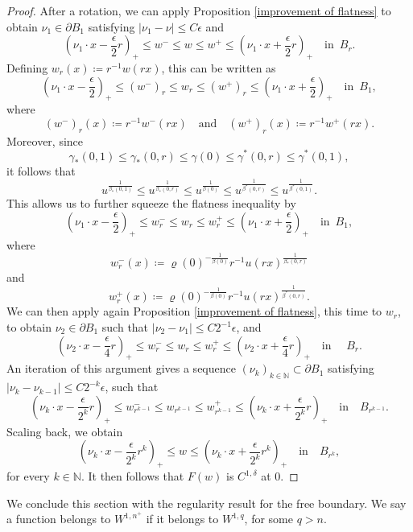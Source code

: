 \documentclass[reqno,11pt]{amsart}
\newcommand{\1}{\mathds{1}}
\numberwithin{equation}{section}
\begin{document}
\begin{proof}
After a rotation, we can apply Proposition \ref{improvement of flatness} to obtain $\nu_1 \in \partial B_1$ satisfying $|\nu_1 - \nu| \leq C\epsilon$ and
$$
    \left(\nu_1 \cdot x - \frac{\epsilon}{2}r\right)_+ \leq w^- \leq w \leq w^+ \leq \left(\nu_1 \cdot x + \frac{\epsilon}{2}r\right)_+ \quad \text{in }\, B_r.
$$ 
Defining $w_r(x) \coloneqq r^{-1}w(rx)$, this can be written as
$$
    \left(\nu_1 \cdot x - \frac{\epsilon}{2}\right)_+ \leq (w^-)_r \leq w_r \leq (w^+)_r \leq \left(\nu_1 \cdot x + \frac{\epsilon}{2}\right)_+ \quad \text{in }\, B_1,
$$
where
$$
   (w^-)_r(x) \coloneqq r^{-1}w^-(rx) \quad \text{and} \quad  (w^+)_r(x) \coloneqq r^{-1}w^+(rx).
$$
Moreover, since
$$
  \gamma_\ast(0,1) \leq \gamma_\ast(0,r) \leq \gamma(0) \leq \gamma^\ast(0,r) \leq \gamma^\ast(0,1),  
$$
it follows that
$$
    u^{\frac{1}{\beta_\ast(0,1)}} \leq u^{\frac{1}{\beta_\ast(0,r)}} \leq u^{\frac{1}{\beta(0)}} \leq u^{\frac{1}{\beta^\ast(0,r)}} \leq u^{\frac{1}{\beta^\ast(0,1)}}.
$$
This allows us to further squeeze the flatness inequality by
$$
    \left(\nu_1 \cdot x - \frac{\epsilon}{2}\right)_+ \leq w^-_r \leq w_r \leq w^+_r \leq \left(\nu_1 \cdot x + \frac{\epsilon}{2}\right)_+ \quad \text{in }\, B_1,
$$
where
$$w^-_r(x) \coloneqq \varrho(0)^{-\frac{1}{\beta(0)}} r^{-1}u(rx)^{\frac{1}{\beta_\ast(0,r)}}$$ 
and
$$w^+_r(x) \coloneqq \varrho(0)^{-\frac{1}{\beta(0)}} r^{-1}u(rx)^{\frac{1}{\beta^\ast(0,r)}}. $$
We can then apply again Proposition \ref{improvement of flatness}, this time to $w_r$, to obtain $\nu_2 \in \partial B_1$ such that $|\nu_2 - \nu_1| \leq C2^{-1}\epsilon$, and 
$$
    \left(\nu_2 \cdot x - \frac{\epsilon}{4}r\right)_+ \leq w^-_r \leq w_r \leq w^+_r \leq \left(\nu_2 \cdot x + \frac{\epsilon}{4}r\right)_+ \quad \text{in } \quad B_r.
$$
An iteration of this argument gives a sequence $(\nu_k)_{k \in \mathbb{N}} \subset \partial B_1$ satisfying $|\nu_k - \nu_{k-1}| \leq C 2^{-k}\epsilon$, such that
$$
    \left(\nu_k \cdot x - \frac{\epsilon}{2^k}r\right)_+ \leq w^-_{r^{k-1}} \leq w_{r^{k-1}} \leq w^+_{r^{k-1}} \leq \left(\nu_k \cdot x + \frac{\epsilon}{2^k}r\right)_+ \quad \text{in} \quad B_{r^{k-1}}.
$$
Scaling back, we obtain
$$
    \left(\nu_k\cdot x - \frac{\epsilon}{2^k}r^k\right)_+ \leq w \leq \left(\nu_k\cdot x + \frac{\epsilon}{2^k} r^k\right)_+ \quad \text{in} \quad B_{r^k},
$$
for every $k \in \mathbb{N}$. It then follows that $F(w)$ is $C^{1,\delta}$ at $0$.
\end{proof}

We conclude this section with the regularity result for the free boundary. We say a function belongs to $W^{1,n^{+}}$ if it belongs to $W^{1,q}$, for some $q>n$.
\end{document}
